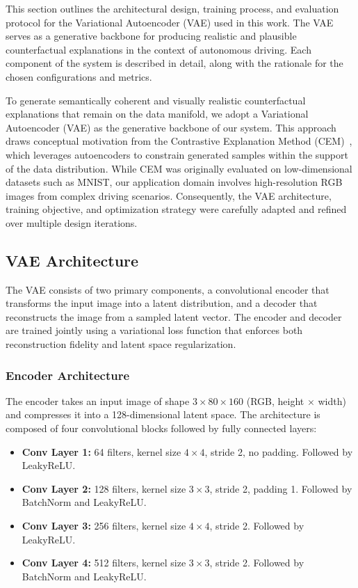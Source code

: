 This section outlines the architectural design, training process, and evaluation protocol for the Variational Autoencoder (VAE) used in this work. The VAE serves as a generative backbone for producing realistic and plausible counterfactual explanations in the context of autonomous driving. Each component of the system is described in detail, along with the rationale for the chosen configurations and metrics.

To generate semantically coherent and visually realistic counterfactual explanations that remain on the data manifold, we adopt a Variational Autoencoder (VAE) as the generative backbone of our system. This approach draws conceptual motivation from the Contrastive Explanation Method (CEM)~\cite{DBLP:journals/corr/abs-1802-07623}, which leverages autoencoders to constrain generated samples within the support of the data distribution. While CEM was originally evaluated on low-dimensional datasets such as MNIST, our application domain involves high-resolution RGB images from complex driving scenarios. Consequently, the VAE architecture, training objective, and optimization strategy were carefully adapted and refined over multiple design iterations.

\subsection{VAE Architecture} \label{sec:vae_architecture}

The VAE consists of two primary components, a convolutional encoder that transforms the input image into a latent distribution, and a decoder that reconstructs the image from a sampled latent vector. The encoder and decoder are trained jointly using a variational loss function that enforces both reconstruction fidelity and latent space regularization.

\subsubsection{Encoder Architecture} \label{subsubsec:vae_encoder}

The encoder takes an input image of shape $3 \times 80 \times 160$ (RGB, height $\times$ width) and compresses it into a 128-dimensional latent space. The architecture is composed of four convolutional blocks followed by fully connected layers:

\begin{itemize}
    \item \textbf{Conv Layer 1:} 64 filters, kernel size $4 \times 4$, stride 2, no padding. Followed by LeakyReLU.
    \item \textbf{Conv Layer 2:} 128 filters, kernel size $3 \times 3$, stride 2, padding 1. Followed by BatchNorm and LeakyReLU.
    \item \textbf{Conv Layer 3:} 256 filters, kernel size $4 \times 4$, stride 2. Followed by LeakyReLU.
    \item \textbf{Conv Layer 4:} 512 filters, kernel size $3 \times 3$, stride 2. Followed by BatchNorm and LeakyReLU.
\end{itemize}

